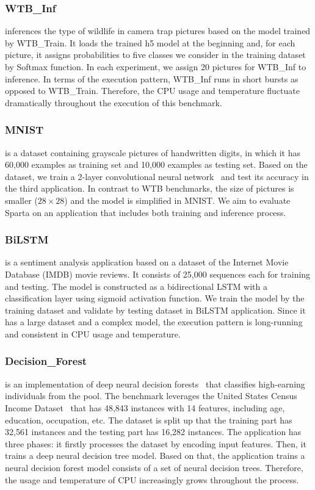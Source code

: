 \subsubsection{WTB\_Inf}

inferences the type of wildlife in camera trap pictures based on the model trained by WTB\_Train. It loads the trained h5 model at the beginning and, for each picture, it assigns probabilities to five classes we consider in the training dataset by Softmax function. In each experiment, we assign 20 pictures for WTB\_Inf to inference. In terms of the execution pattern, WTB\_Inf runs in short bursts as opposed to WTB\_Train. Therefore, the CPU usage and temperature fluctuate dramatically throughout the execution of this benchmark.

\subsubsection{MNIST}

 is a dataset containing grayscale pictures of handwritten digits, in which it has 60,000 examples as training set and 10,000 examples as testing set. Based on the dataset, we train a 2-layer convolutional neural network~\cite{ref:MNIST} and test its accuracy in the third application. In contrast to WTB benchmarks, the size of pictures is smaller ($28 \times 28$) and the model is simplified in MNIST. We aim to evaluate Sparta on an application that includes both training and inference process. 

\subsubsection{BiLSTM} is a sentiment analysis application based on a dataset of the Internet Movie Database (IMDB) movie reviews. It consists of 25,000 sequences each for training and testing. The model is constructed as a bidirectional LSTM with a classification layer using sigmoid activation function. We train the model by the training dataset and validate by testing dataset in BiLSTM application. Since it has a large dataset and a complex model, the execution pattern is long-running and consistent in CPU usage and temperature.


\subsubsection{Decision\_Forest} is an implementation of deep neural decision forests~\cite{ref:decision_forest} that classifies high-earning individuals from the pool. The benchmark leverages the United States Census Income Dataset~\cite{ref:uci} that has 48,843 instances with 14 features, including age, education, occupation, etc. The dataset is split up that the training part has 32,561 instances and the testing part has 16,282 instances. The application has three phases: it firstly processes the dataset by encoding input features. Then, it trains a deep neural decision tree model. Based on that, the application trains a neural decision forest model consists of a set of neural decision trees. Therefore, the usage and temperature of CPU increasingly grows throughout the process.


